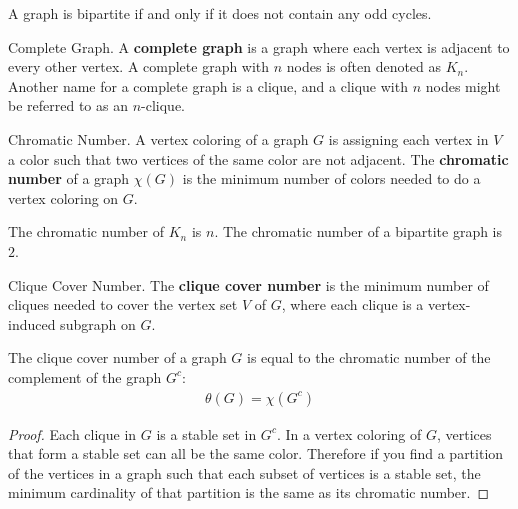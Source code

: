 \begin{nonumtheorem}
    \label{thm:bipartite-odd}
    A graph is bipartite if and only if it does not contain any odd cycles.
\end{nonumtheorem}

\begin{definition}{Complete Graph.}
    \label{defn:clique}
    A \textbf{complete graph} is a graph where each vertex is adjacent to every other vertex. A complete graph with $n$ nodes is often denoted as $K_n$. Another name for a complete graph is a clique, and a clique with $n$ nodes might be referred to as an $n$-clique.
\end{definition}

\begin{definition}{Chromatic Number.}
    \label{defn:colors}
	A vertex coloring of a graph $G$ is assigning each vertex in $V$ a color such that two vertices of the same color are not adjacent. The \textbf{chromatic number} of a graph $\chi(G)$ is the minimum number of colors needed to do a vertex coloring on $G$.
\end{definition}

\begin{remark}
    The chromatic number of $K_n$ is $n$. The chromatic number of a bipartite graph is $2$.
\end{remark}

\begin{definition}{Clique Cover Number.}
    \label{defn:clique-cover-num}
    The \textbf{clique cover number} is the minimum number of cliques needed to cover the vertex set $V$ of $G$, where each clique is a vertex-induced subgraph on $G$.
\end{definition}

\begin{proposition}
    \label{prop:chrom-clique}
    The clique cover number of a graph $G$ is equal to the chromatic number of the complement of the graph $G^c$:
    \begin{align}
        \theta(G) = \chi(G^c)
    \end{align}
\end{proposition}

\begin{proof}
    Each clique in $G$ is a stable set in $G^c$. In a vertex coloring of $G$, vertices that form a stable set can all be the same color. Therefore if you find a partition of the vertices in a graph such that each subset of vertices is a stable set, the minimum cardinality of that partition is the same as its chromatic number.
\end{proof}

